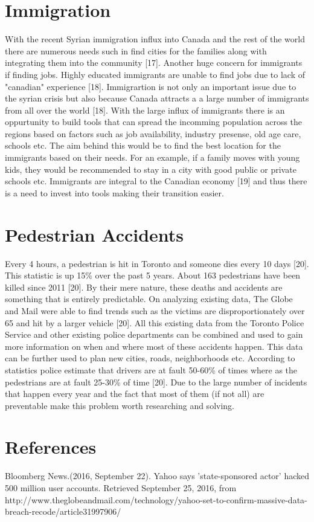 \documentclass{article}
\begin{document}
\section{Immigration}
With the recent Syrian immigration influx into Canada and the rest of the world there are numerous needs such in find cities for the families along with integrating them into the community [17]. Another huge concern for immigrants if finding jobs. Highly educated immigrants are unable to find jobs due to lack of "canadian" experience [18]. Immigrartion is not only an important issue due to the syrian crisis but also because Canada attracts a a large number of immigrants from all over the world [18]. With the large influx of immigrants there is an oppurtunity to build tools that can spread the incomming population across the regions based on factors such as job availability, industry presense, old age care, schools etc. The aim behind this would be to find the best location for the immigrants based on their needs. For an example, if a family moves with young kids, they would be recommended to stay in a city with good public or private schools etc. Immigrants are integral to the Canadian economy [19] and thus there is a need to invest into tools making their transition easier.

\section{Pedestrian Accidents}
Every 4 hours, a pedestrian is hit in Toronto and someone dies every 10 days [20]. This statistic is up 15\% over the past 5 years. About 163 pedestrians have been killed since 2011 [20]. By their mere nature, these deaths and accidents are something that is entirely predictable. On analyzing existing data, The Globe and Mail were able to find trends such as the victims are disproportionately over 65 and hit by a larger vehicle [20]. All this existing data from the Toronto Police Service and other existing police departments can be combined and used to gain more information on when and where most of these accidents happen. This data can be further used to plan new cities, roads, neighborhoods etc. According to statistics police estimate that drivers are at fault 50-60\% of times where as the pedestrians are at fault 25-30\% of time [20]. Due to the large number of incidents that happen every year and the fact that most of them (if not all) are preventable make this problem worth researching and solving.

\section{References}
\noindent
[1] Bloomberg News.(2016, September 22). Yahoo says 'state-sponsored actor' hacked 500 million user accounts. Retrieved September 25, 2016, from http://www.theglobeandmail.com/technology/yahoo-set-to-confirm-massive-data-breach-recode/article31997906/\\
\end{document}
